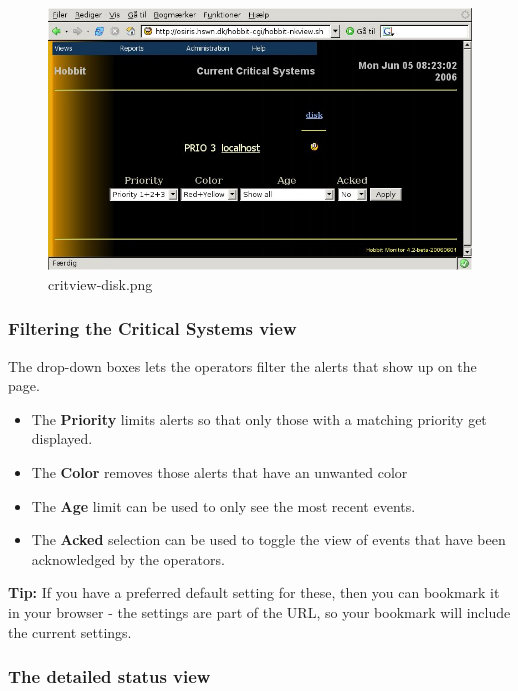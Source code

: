 \begin{figure} \centering \caption{critview-disk.png}\label{critview-disk.png}
\includegraphics[scale=0.5]{./critview-disk.png} 
\end{figure}

\subsubsection{Filtering the Critical Systems view}


 The drop-down boxes lets the operators filter the alerts that show up
 on the page. 

\begin{itemize}
\item The \textbf{Priority}
 limits alerts so that only those with a matching priority get displayed.
\item The \textbf{Color}
 removes those alerts that have an unwanted color
\item The \textbf{Age}
 limit can be used to only see the most recent events.
\item The \textbf{Acked}
 selection can be used to toggle the view of events that have been acknowledged by the operators. 

\end{itemize}



 \textbf{Tip:}
 If you have a preferred default setting for these, then you can
 bookmark it in your browser - the settings are part of the URL, so
 your bookmark will include the current settings.

\subsubsection{The detailed status view}


